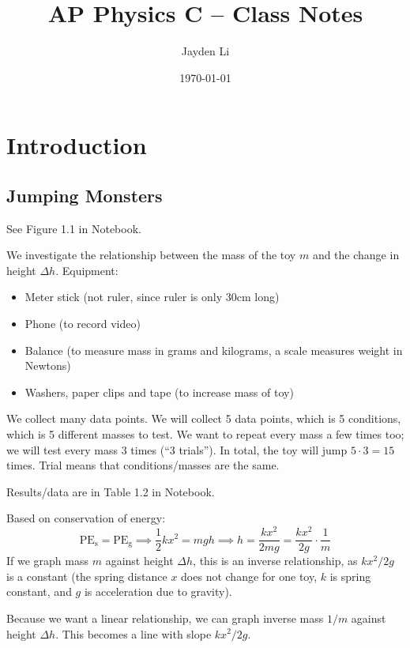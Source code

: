 \documentclass{article}
\title{\vspace*{-40pt}AP Physics C -- Class Notes}
\author{Jayden Li}
\date{\today}
\begin{document}
\fontsize{11pt}{12pt}\selectfont
\setlength{\abovedisplayskip}{\abovedisplayskip/2}
\setlength{\belowdisplayskip}{\belowdisplayskip/2}
\setlength{\parindent}{0pt}
\setlength{\parskip}{2ex plus 0.5ex minus 0.2ex}
\maketitle

\tableofcontents

\section{Introduction}

\subsection{Jumping Monsters}

See Figure 1.1 in Notebook.

We investigate the relationship between the mass of the toy $m$ and the change in height $\Delta h$. Equipment:
\begin{itemize}
	\item Meter stick (not ruler, since ruler is only 30cm long)
	\item Phone (to record video)
	\item Balance (to measure mass in grams and kilograms, a scale measures weight in Newtons)
	\item Washers, paper clips and tape (to increase mass of toy)
\end{itemize}

We collect many data points. We will collect 5 data points, which is 5 conditions, which is 5 different masses to test.  We want to repeat every mass a few times too; we will test every mass 3 times (``3 trials''). In total, the toy will jump $5\cdot 3=15$ times. Trial means that conditions/masses are the same.

Results/data are in Table 1.2 in Notebook.

Based on conservation of energy:
\begin{equation*}
    \text{PE}_ \text{s}= \text{PE}_ \text{g}
	\implies \frac12kx^2=mgh
	\implies h=\frac{kx^2}{2mg}=\frac{kx^2}{2g}\cdot\frac1m
\end{equation*}
If we graph mass $m$ against height $\Delta h$, this is an inverse relationship, as $kx^2/2g$ is a constant (the spring distance $x$ does not change for one toy, $k$ is spring constant, and $g$ is acceleration due to gravity).

Because we want a linear relationship, we can graph inverse mass $1/m$ against height $\Delta h$. This becomes a line with slope $kx^2/2g$.
\end{document}
